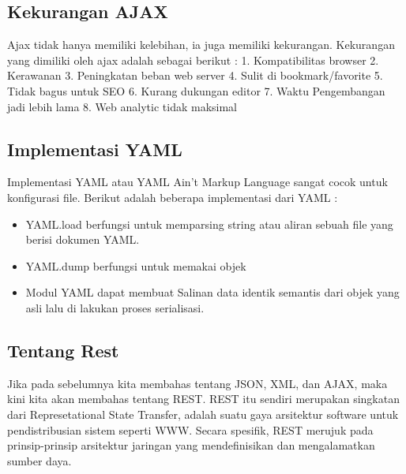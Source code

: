 \documentclass[a4paper]{article}
\begin{document}
\subsection{Kekurangan AJAX}
Ajax tidak hanya memiliki kelebihan, ia juga memiliki kekurangan. Kekurangan yang dimiliki oleh ajax adalah sebagai berikut :
1.	Kompatibilitas browser
2.	Kerawanan
3.	Peningkatan beban web server
4.	Sulit di bookmark/favorite
5.	Tidak bagus untuk SEO
6.	Kurang dukungan editor
7.	Waktu Pengembangan jadi lebih lama
8.	Web analytic tidak maksimal

\subsection{Implementasi YAML}
Implementasi YAML atau YAML Ain’t Markup Language sangat cocok untuk konfigurasi file.
Berikut adalah beberapa implementasi dari YAML :
\begin{itemize}
\item YAML.load berfungsi untuk memparsing string atau aliran sebuah file yang berisi dokumen YAML.
\item YAML.dump berfungsi untuk memakai objek 
\item Modul YAML dapat membuat Salinan data identik semantis dari objek yang asli lalu di lakukan proses serialisasi.

\end{itemize}
\subsection{Tentang Rest}
Jika pada sebelumnya kita membahas tentang JSON, XML, dan AJAX, maka kini kita akan membahas tentang REST. REST itu sendiri merupakan singkatan dari Represetational State Transfer, adalah suatu gaya arsitektur software untuk pendistribusian sistem seperti WWW. Secara spesifik, REST merujuk pada prinsip-prinsip arsitektur jaringan yang mendefinisikan dan mengalamatkan sumber daya.
\end{document}
